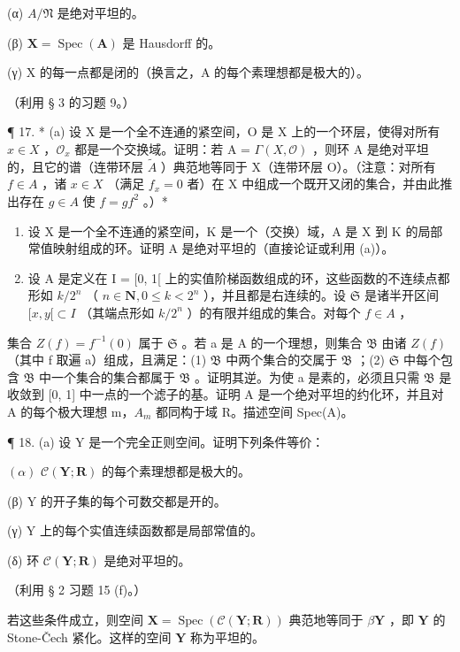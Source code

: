 (α) \(A/\mathfrak{N}\) 是绝对平坦的。

(β) \(\mathbf{X} = \operatorname{Spec}(\mathbf{A})\) 是 Hausdorff 的。

(γ) X 的每一点都是闭的（换言之，A 的每个素理想都是极大的）。

（利用 § 3 的习题 9。）

¶ 17. * (a) 设 X 是一个全不连通的紧空间，O 是 X 上的一个环层，使得对所有 \(x \in X\) ，\(\mathcal{O}_x\) 都是一个交换域。证明：若 A = \(\Gamma(X, \mathcal{O})\) ，则环 A 是绝对平坦的，且它的谱（连带环层 \(\tilde{A}\) ）典范地等同于 X（连带环层 O）。（注意：对所有 \(f \in A\) ，诸 \(x \in X\) （满足 \(f_x = 0\) 者）在 X 中组成一个既开又闭的集合，并由此推出存在 \(g \in A\) 使 \(f = gf^2\) 。）*

\begin{enumerate}
\def\labelenumi{(\alph{enumi})}
\setcounter{enumi}{1}
\item
  设 X 是一个全不连通的紧空间，K 是一个（交换）域，A 是 X 到 K 的局部常值映射组成的环。证明 A 是绝对平坦的（直接论证或利用 (a)）。
\item
  设 A 是定义在 I = {[}0, 1{[} 上的实值阶梯函数组成的环，这些函数的不连续点都形如 \(k/2^n\) （ \(n \in \mathbf{N}, 0 \leqslant k < 2^n\) ），并且都是右连续的。设 \(\mathfrak{S}\) 是诸半开区间 \([x, y[ \subset I\) （其端点形如 \(k/2^n\) ）的有限并组成的集合。对每个 \(f \in A\) ，
\end{enumerate}

集合 \(Z(f) = f^{-1}(0)\) 属于 \(\mathfrak{S}\) 。若 a 是 A 的一个理想，则集合 \(\mathfrak{B}\) 由诸 \(Z(f)\) （其中 f 取遍 a）组成，且满足：(1) \(\mathfrak{B}\) 中两个集合的交属于 \(\mathfrak{B}\) ；(2) \(\mathfrak{S}\) 中每个包含 \(\mathfrak{B}\) 中一个集合的集合都属于 \(\mathfrak{B}\) 。证明其逆。为使 a 是素的，必须且只需 \(\mathfrak{B}\) 是收敛到 {[}0, 1{]} 中一点的一个滤子的基。证明 A 是一个绝对平坦的约化环，并且对 A 的每个极大理想 m，\(A_{m}\) 都同构于域 R。描述空间 Spec(A)。

¶ 18. (a) 设 Y 是一个完全正则空间。证明下列条件等价：

\((\alpha)\) \(\mathcal{C}(\mathbf{Y};\mathbf{R})\) 的每个素理想都是极大的。

(β) Y 的开子集的每个可数交都是开的。

(γ) Y 上的每个实值连续函数都是局部常值的。

(δ) 环 \(\mathcal{C}(\mathbf{Y};\mathbf{R})\) 是绝对平坦的。

（利用 § 2 习题 15 (f)。）

若这些条件成立，则空间 \(\mathbf{X} = \operatorname{Spec}(\mathcal{C}(\mathbf{Y};\mathbf{R}))\) 典范地等同于 \(\beta \mathbf{Y}\) ，即 \(\mathbf{Y}\) 的 Stone-Čech 紧化。这样的空间 \(\mathbf{Y}\) 称为平坦的。


